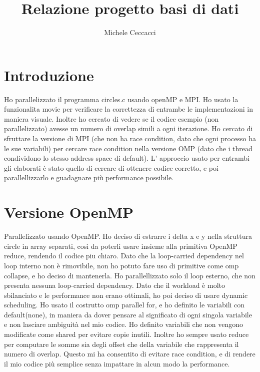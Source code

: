 \documentclass[a4paper,12pt]{report}
\begin{document}
\title{Relazione progetto basi di dati}
\author{Michele Ceccacci}

\chapter*{Introduzione}
Ho parallelizzato il programma circles.c usando openMP e MPI. Ho usato la funzionalita movie per verificare la correttezza di entrambe le implementazioni in maniera visuale. Inoltre ho cercato di vedere se il codice esempio (non parallelizzato) avesse un numero di overlap simili a ogni iterazione. Ho cercato di sfruttare la versione di MPI (che non ha race condition, dato che ogni processo ha le sue variabili) per cercare race condition nella versione OMP (dato che i thread condividono lo stesso address space di default). 
L' approccio usato per entrambi gli elaborati è stato quello di cercare di ottenere codice corretto, e poi parallellizzarlo e guadagnare più performance possibile.
\chapter{Versione OpenMP}
Parallelizzato usando OpenMP.
Ho deciso di estrarre i delta x e y nella struttura circle in array separati, così da poterli usare insieme alla primitiva OpenMP reduce, rendendo il codice piu chiaro.
Dato che la loop-carried dependency nel loop interno non è rimovibile, non ho potuto fare uso di primitive come omp collapse, e ho deciso di mantenerla. 
Ho parallellizzato solo il loop esterno, che non presenta nessuna loop-carried dependency. 
Dato che il workload è molto sbilanciato e le performance non erano ottimali, ho poi deciso di usare dynamic scheduling.
Ho usato il costrutto omp parallel for, e ho definito le variabili con default(none), in maniera da dover pensare al significato di ogni singola variabile e non lasciare ambiguità nel mio codice. Ho definito variabili che non vengono modificate come shared per evitare copie inutili. 
Inoltre ho sempre usato reduce per computare le somme sia degli offset che della variabile che rappresenta il numero di overlap.
Questo mi ha consentito di evitare race condition, e di rendere il mio codice più semplice senza impattare in alcun modo la performance.
\end{document}

